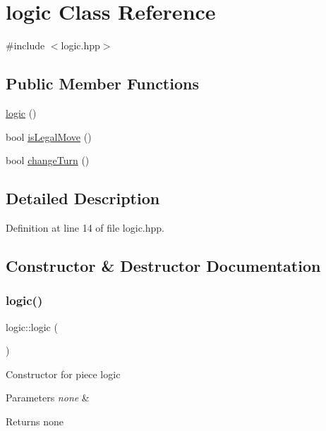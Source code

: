 \hypertarget{classlogic}{}\section{logic Class Reference}
\label{classlogic}


{\ttfamily \#include $<$logic.\+hpp$>$}

\subsection*{Public Member Functions}
\begin{DoxyCompactItemize}
\item 
\mbox{\hyperlink{classlogic_a2e8c1ac53198a709ddfccdd002d9dac6}{logic}} ()
\item 
bool \mbox{\hyperlink{classlogic_af7266d036a6df1328c85b8ea6bfb0fab}{is\+Legal\+Move}} ()
\item 
bool \mbox{\hyperlink{classlogic_ae9ff5d7c6cbe86bf69e338e9bb7c0d6c}{change\+Turn}} ()
\end{DoxyCompactItemize}


\subsection{Detailed Description}


Definition at line 14 of file logic.\+hpp.



\subsection{Constructor \& Destructor Documentation}
\mbox{\label{classlogic_a2e8c1ac53198a709ddfccdd002d9dac6}} 
\subsubsection{\texorpdfstring{logic()}{logic()}}
{\footnotesize\ttfamily logic\+::logic (\begin{DoxyParamCaption}{ }\end{DoxyParamCaption})}

Constructor for piece logic


\begin{DoxyParams}{Parameters}
{\em none} & \\
\hline
\end{DoxyParams}
\begin{DoxyReturn}{Returns}
none 
\end{DoxyReturn}


